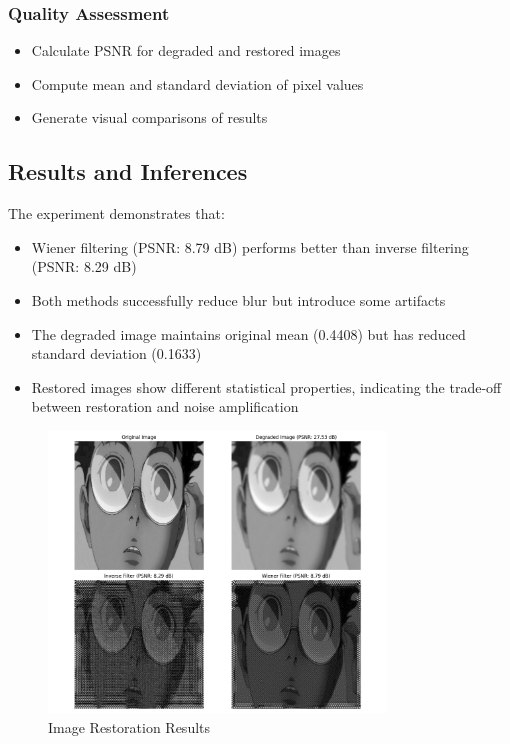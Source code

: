 \documentclass[12pt,a4paper]{article}
\begin{document}
\subsubsection{Quality Assessment}
\begin{itemize}
  \item Calculate PSNR for degraded and restored images
  \item Compute mean and standard deviation of pixel values
  \item Generate visual comparisons of results
\end{itemize}

\subsection{Results and Inferences}
The experiment demonstrates that:
\begin{itemize}
  \item Wiener filtering (PSNR: 8.79 dB) performs better than inverse filtering (PSNR: 8.29 dB)
  \item Both methods successfully reduce blur but introduce some artifacts
  \item The degraded image maintains original mean (0.4408) but has reduced standard deviation (0.1633)
  \item Restored images show different statistical properties, indicating the trade-off between restoration and noise amplification
\end{itemize}

\begin{figure}[H]
  \centering
  \includegraphics[width=0.8\textwidth]{image_restoration/restoration_comparison.png}
  \caption{Image Restoration Results}
  \label{fig:image_restoration}
\end{figure}
\end{document}
